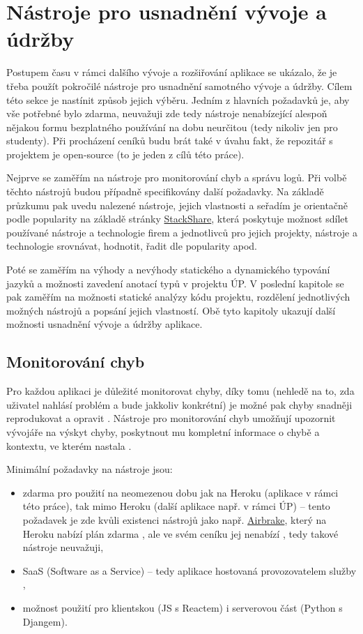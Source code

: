 \chapter{Nástroje pro usnadnění vývoje a údržby}\label{chap:nastrojeprousnadnenivyvojeaudrzby}

Postupem času v rámci dalšího vývoje a rozšiřování aplikace se ukázalo, že je třeba použít pokročilé nástroje pro usnadnění samotného vývoje a údržby. Cílem této sekce je nastínit způsob jejich výběru. Jedním z hlavních požadavků je, aby vše potřebné bylo zdarma, neuvažuji zde tedy nástroje nenabízející alespoň nějakou formu bezplatného používání na dobu neurčitou (tedy nikoliv jen pro studenty). Při procházení ceníků budu brát také v úvahu fakt, že repozitář s projektem je open-source (to je jeden z cílů této práce). 

Nejprve se zaměřím na nástroje pro monitorování chyb a správu logů. Při volbě těchto nástrojů budou případně specifikovány další požadavky. Na základě průzkumu pak uvedu nalezené nástroje, jejich vlastnosti a seřadím je orientačně podle popularity na základě stránky \href{https://stackshare.io/}{StackShare}, která poskytuje \cite{stackshare} možnost sdílet používané nástroje a technologie firem a jednotlivců pro jejich projekty, nástroje a technologie srovnávat, hodnotit, řadit dle popularity apod.

Poté se zaměřím na výhody a nevýhody statického a dynamického typování jazyků a možnosti zavedení anotací typů v projektu ÚP. V poslední kapitole se pak zaměřím na možnosti statické analýzy kódu projektu, rozdělení jednotlivých možných nástrojů a popsání jejich vlastností. Obě tyto kapitoly ukazují další možnosti usnadnění vývoje a údržby aplikace.

\section{Monitorování chyb}\label{sec:monitorovanichyb}
Pro každou aplikaci je důležité monitorovat chyby, díky tomu (nehledě na to, zda uživatel nahlásí problém a bude jakkoliv konkrétní) je možné pak chyby snadněji reprodukovat a opravit \cite{tools-exception}. Nástroje pro monitorování chyb umožňují upozornit vývojáře na výskyt chyby, poskytnout mu kompletní informace o chybě a kontextu, ve kterém nastala \cite{tools-exception}.

Minimální požadavky na nástroje jsou:
\begin{itemize}
    \item zdarma pro použití na neomezenou dobu jak na Heroku (aplikace v rámci této práce), tak mimo Heroku (další aplikace např. v rámci ÚP) -- tento požadavek je zde kvůli existenci nástrojů jako např. \href{https://airbrake.io/}{Airbrake}, který na Heroku nabízí plán zdarma \cite{airbrake-heroku}, ale ve svém ceníku jej nenabízí \cite{airbrake-pricing}, tedy takové nástroje neuvažuji,
    \item SaaS (Software as a Service) -- tedy aplikace hostovaná provozovatelem služby \cite{oracle-saas},
    \item možnost použití pro klientskou (JS s Reactem) i serverovou část (Python s Djangem).
\end{itemize}

